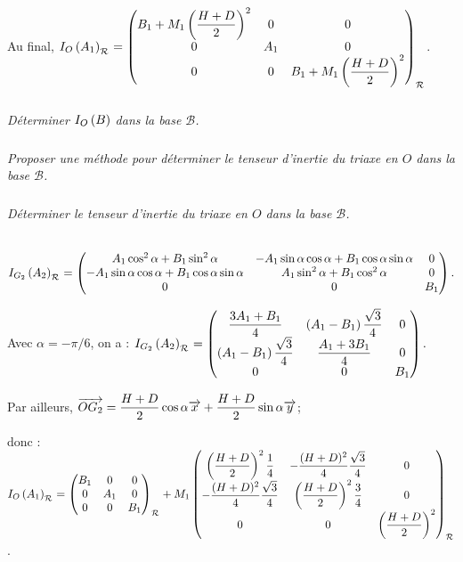 \documentclass[10pt,fleqn]{article} %
\begin{document}
\begin{multicols}{2}
\begin{corrige}
Au final, 
$\inertie{O}{A_1}_{\rep{}}=\matinertie{B_1+M_1\left( \dfrac{H+D}{2}\right)^2}{A_1}{B_1+M_1\left( \dfrac{H+D}{2}\right)^2}{0}{0}{0}{\rep{}}$.
 
\end{corrige}
\else
\fi

\subparagraph{}
\textit{Déterminer $\inertie{O}{B}$  dans la base $\mathcal{B}$.}



\subparagraph{}
\textit{Proposer une méthode pour déterminer le tenseur d'inertie du triaxe en $O$ dans la base $\mathcal{B}$.}

\subparagraph{}
\textit{Déterminer le tenseur d'inertie du triaxe en $O$ dans la base $\mathcal{B}$.}


\ifprof

\begin{corrige}  ~\\


 $\inertie{G_2}{A_2}_{\rep{}}=
\begin{pmatrix}
A_1 \cos^2\alpha +B_1 \sin^2\alpha& -A_1 \sin\alpha\cos\alpha+B_1\cos\alpha\sin\alpha & 0 \\ 
-A_1\sin \alpha\cos\alpha+B_1\cos\alpha\sin\alpha  &A_1\sin^2\alpha+ B_1\cos^2 \alpha & 0 \\ 0 & 0 & B_1 \\ \end{pmatrix}.$



Avec $\alpha=-\pi/6$, 
on a : 
 $\inertie{G_2}{A_2}_{\rep{}}=
\begin{pmatrix}
 \dfrac{3A_1 + B_1}{4} & \left(A_1-B_1\right) \dfrac{\sqrt{3}}{4} & 0 \\ 
 \left(A_1-B_1\right) \dfrac{\sqrt{3}}{4}  &\dfrac{A_1+3B_1}{4}  & 0 \\ 0 & 0 & B_1 \\ \end{pmatrix}.$


Par ailleurs, $\vect{OG_2}=\dfrac{H+D}{2}\cos\alpha\vect{x}+\dfrac{H+D}{2}\sin\alpha\vect{y}$; 


donc :
  $\inertie{O}{A_1}_{\rep{}}=\matinertie{B_1}{A_1}{B_1}{0}{0}{0}{\rep{}}+M_1\begin{pmatrix}
\left( \dfrac{H+D}{2}\right)^2\dfrac{1}{4}  & -\dfrac{(H+D)^2}{4}\dfrac{\sqrt{3}}{4}  & 0 \\ 
-\dfrac{(H+D)^2}{4}\dfrac{\sqrt{3}}{4}& \left( \dfrac{H+D}{2}\right)^2\dfrac{3}{4}& 0 \\
 0 & 0 & \left( \dfrac{H+D}{2}\right)^2 \\\end{pmatrix}_{\rep{}}$.
 


\end{corrige}
\end{multicols}
\end{document}
